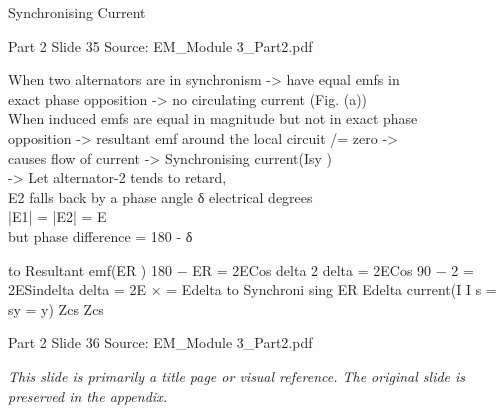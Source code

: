 \documentclass[11pt,a4paper]{article}
\begin{document}
\begin{mdframed}[roundcorner=9pt,backgroundcolor=white,linecolor=anthOrange,linewidth=1pt,innerleftmargin=12pt,innerrightmargin=12pt,innertopmargin=10pt,innerbottommargin=10pt,skipabove=8pt,skipbelow=10pt]
{\HeadingFont\fontsize{15}{18}\selectfont\color{anthDark}Synchronising Current\par}
{\color{anthMid}\small Part 2 \textbullet{} Slide 35 \textbullet{} Source: EM\_Module 3\_Part2.pdf\par}
\vspace{0.5em}
{\small
When two alternators are in synchronism -> have equal emfs in\\
exact phase opposition -> no circulating current (Fig. (a))\\
When induced emfs are equal in magnitude but not in exact phase\\
opposition -> resultant emf around the local circuit /= zero ->\\
causes flow of current -> Synchronising current(Isy )\\
-> Let alternator-2 tends to retard,\\
E2 falls back by a phase angle δ electrical degrees\\
|E1| = |E2| = E\\
but phase difference = 180 - δ\\

}
\end{mdframed}

\begin{mdframed}[roundcorner=9pt,backgroundcolor=white,linecolor=anthBlue,linewidth=1pt,innerleftmargin=12pt,innerrightmargin=12pt,innertopmargin=10pt,innerbottommargin=10pt,skipabove=8pt,skipbelow=10pt]
{\HeadingFont\fontsize{15}{18}\selectfont\color{anthDark}to Resultant emf(ER ) 180 − ER = 2ECos    delta 2 delta = 2ECos 90 −               2 = 2ESindelta delta = 2E × = Edelta to Synchroni sing ER      Edelta current(I I s    = sy = y)    Zcs    Zcs\par}
{\color{anthMid}\small Part 2 \textbullet{} Slide 36 \textbullet{} Source: EM\_Module 3\_Part2.pdf\par}
\vspace{0.5em}
{\small
\textit{This slide is primarily a title page or visual reference. The original slide is preserved in the appendix.}

}
\end{mdframed}
\end{document}
